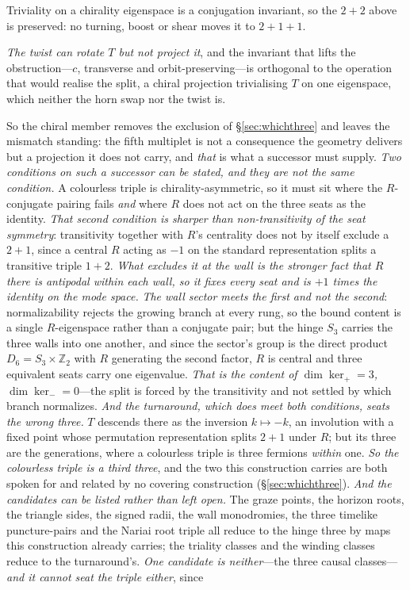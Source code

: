 \documentclass[11pt]{article}
\begin{document}
Triviality on a chirality eigenspace is a conjugation invariant, so the $2+2$ above is preserved: no turning, boost or shear moves it to $2+1+1$. 

\emph{The twist can rotate $T$ but not project it}, and the invariant that lifts the obstruction---$c$, transverse and orbit-preserving---is orthogonal to the operation that would realise the split, a chiral projection trivialising $T$ on one eigenspace, which neither the horn swap nor the twist is. 

So the chiral member removes the exclusion of \S\ref{sec:whichthree} and leaves the mismatch standing: the fifth multiplet is not a consequence the geometry delivers but a projection it does not carry, and \emph{that} is what a successor must supply. \emph{Two conditions on such a successor can be stated, and they are not the same condition.} A colourless triple is chirality-asymmetric, so it must sit where the $R$-conjugate pairing fails \emph{and} where $R$ does not act on the three seats as the identity. \emph{That second condition is sharper than non-transitivity of the seat symmetry}: transitivity together with $R$'s centrality does not by itself exclude a $2{+}1$, since a central $R$ acting as $-1$ on the standard representation splits a transitive triple $1{+}2$. \emph{What excludes it at the wall is the stronger fact that $R$ there is antipodal \emph{within} each wall, so it fixes every seat and is $+1$ times the identity on the mode space.} \emph{The wall sector meets the first and not the second}: normalizability rejects the growing branch at every rung, so the bound content is a single $R$-eigenspace rather than a conjugate pair; but the hinge $S_{3}$ carries the three walls into one another, and since the sector's group is the direct product $D_{6}=S_{3}\times\mathbb{Z}_{2}$ with $R$ generating the second factor, $R$ is central and three equivalent seats carry one eigenvalue. \emph{That is the content of $\dim\ker_{+}=3$, $\dim\ker_{-}=0$}---the split is forced by the transitivity and not settled by which branch normalizes. \emph{And the turnaround, which does meet both conditions, seats the wrong three.} $T$ descends there as the inversion $k\mapsto-k$, an involution with a fixed point whose permutation representation splits $2{+}1$ under $R$; but its three are the generations, where a colourless triple is three fermions \emph{within} one. \emph{So the colourless triple is a third three}, and the two this construction carries are both spoken for and related by no covering construction (\S\ref{sec:whichthree}). \emph{And the candidates can be listed rather than left open.} The graze points, the horizon roots, the triangle sides, the signed radii, the wall monodromies, the three timelike puncture-pairs and the Nariai root triple all reduce to the hinge three by maps this construction already carries; the triality classes and the winding classes reduce to the turnaround's. \emph{One candidate is neither}---the three causal classes---\emph{and it cannot seat the triple either}, since 
\end{document}
